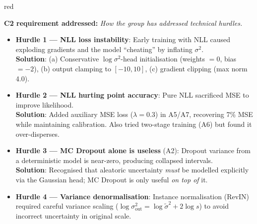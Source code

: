 \documentclass[11pt,a4paper]{article}
\begin{document}
\newpage

\begin{speakerbox}{red}

\textbf{C2 requirement addressed:} \textit{How the group has addressed technical hurdles.}

\begin{talkingpoints}
\begin{itemize}[leftmargin=*]
    \item \textbf{Hurdle 1 --- NLL loss instability}: Early training with NLL caused exploding gradients and the model ``cheating'' by inflating $\sigma^2$. \\
    \textbf{Solution}: (a) Conservative $\log\sigma^2$-head initialisation (weights $= 0$, bias $= -2$), (b) output clamping to $[-10, 10]$, (c) gradient clipping (max norm 4.0).

    \item \textbf{Hurdle 2 --- NLL hurting point accuracy}: Pure NLL sacrificed MSE to improve likelihood. \\
    \textbf{Solution}: Added auxiliary MSE loss ($\lambda = 0.3$) in A5/A7, recovering 7\% MSE while maintaining calibration. Also tried two-stage training (A6) but found it over-disperses.

    \item \textbf{Hurdle 3 --- MC Dropout alone is useless} (A2): Dropout variance from a deterministic model is near-zero, producing collapsed intervals. \\
    \textbf{Solution}: Recognised that aleatoric uncertainty \emph{must} be modelled explicitly via the Gaussian head; MC Dropout is only useful \emph{on top of} it.

    \item \textbf{Hurdle 4 --- Variance denormalisation}: Instance normalisation (RevIN) required careful variance scaling ($\log\sigma^2_{\text{out}} = \log\tilde{\sigma}^2 + 2\log s$) to avoid incorrect uncertainty in original scale.
\end{itemize}
\end{talkingpoints}

\end{speakerbox}

\vspace{6pt}
\end{document}

